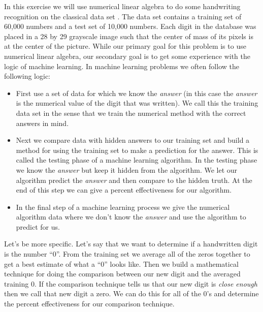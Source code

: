 \begin{problem}
    In this exercise we will use numerical linear algebra to do some handwriting
    recognition on the classical data set .  The  data set
    contains a training set of 60,000 numbers and a test set of 10,000 numbers.  Each
    digit in the database was placed in a 28 by 29 grayscale image such that the center of
    mass of its pixels is at the center of the picture.  While our primary goal for this
    problem is to use numerical linear algebra, our secondary goal is to get some
    experience with the logic of machine learning.  In machine learning problems we often
    follow the following logic:
    \begin{itemize}
        \item First use a set of data for which we know the {\it answer} (in this case the
            {\it answer} is the numerical value of the digit that was written).  We call
            this the training data set in the sense that we train the numerical method
            with the correct answers in mind.
        \item Next we compare data with hidden answers to our training set and build a
            method for using the training set to make a prediction for the answer.  This
            is called the testing phase of a machine learning algorithm.  In the testing
            phase we know the {\it answer} but keep it hidden from the algorithm.  We let
            our algorithm predict the {\it answer} and then compare to the hidden truth.
            At the end of this step we can give a percent effectiveness for our algorithm.
        \item In the final step of a machine learning process we give the numerical
            algorithm data where we don't know the {\it answer} and use the algorithm to
            predict for us.  
    \end{itemize}

    Let's be more specific.  Let's say that we want to determine if a handwritten digit is
    the number ``0''.  From the training set we average all of the zeros together to get a
    best estimate of what a ``0'' looks like.  Then we build a mathematical technique for
    doing the comparison between our new digit and the averaged training 0.  If the
    comparison technique tells us that our new digit is {\it close enough} then we call
    that new digit a zero. We can do this for all of the  0's and determine
    the percent effectiveness for our comparison technique. 


\end{problem}
